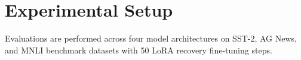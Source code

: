 \section{Experimental Setup}
Evaluations are performed across four model architectures on SST-2, AG News, and MNLI benchmark datasets with 50 LoRA recovery fine-tuning steps.

